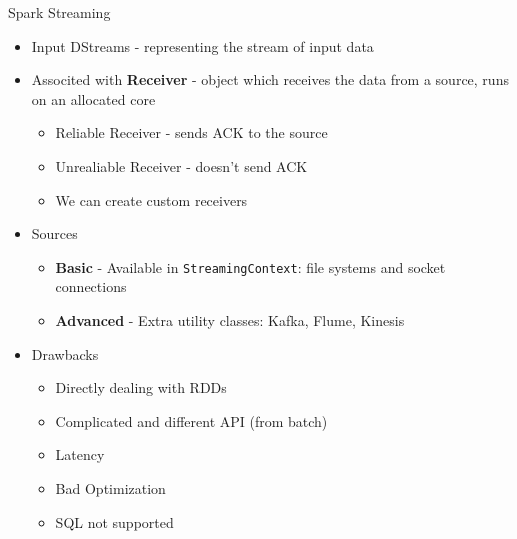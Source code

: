 \documentclass{beamer}
\begin{document}
\begin{frame}{Spark Streaming}
	\begin{itemize}
		\item<1-> Input DStreams - representing the stream of input data
		\item<2-> Associted with \textbf{Receiver} - object which receives the data from a source, runs on an allocated core
		\begin{itemize}
			\item<3-> Reliable Receiver - sends ACK to the source
			\item<4-> Unrealiable Receiver - doesn't send ACK
			\item<5-> We can create custom receivers
		\end{itemize}
		\item<6-> Sources
		\begin{itemize}
			\item<7-> \textbf{Basic} - Available in \texttt{StreamingContext}: file systems and socket connections
			\item<8-> \textbf{Advanced} - Extra utility classes: Kafka, Flume, Kinesis
		\end{itemize}
		\item<9-> Drawbacks
		\begin{itemize}
			\item<10-> Directly dealing with RDDs
			\item<11-> Complicated and different API (from batch)
			\item<12-> Latency
			\item<13-> Bad Optimization
			\item<14-> SQL not supported
		\end{itemize}
	\end{itemize}
\end{frame}
\end{document}
